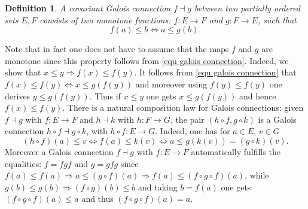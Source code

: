 \documentclass[12pt]{article}
\newtheorem{defn}[thm]{Definition}
\begin{document}
\begin{defn}\label{galois connection}
 A covariant Galois connection $f \dashv g$ between two  partially ordered sets $E,F$ consists of two monotone  functions: $f : E \to F$ and $g: F \to E$, such that 
\begin{equation}\label{equ galois connection}
f(a) \leq b \iff  a \leq  g(b).	
\end{equation}
\end{defn}
Note that in fact one does not have to assume that the maps $f$ and $g$ are monotone since this property follows from \eqref{equ galois connection}. Indeed, we show that $x\leq y\Rightarrow f(x)\leq f(y)$. It follows from \eqref{equ galois connection} that  $f(x)\leq f(y)\iff x\leq g(f(y))$ and moreover using $f(y)\leq f(y)$ one derives $y\leq  g(f(y))$. Thus if $x\leq y$ one gets $x\leq g(f(y))$ and hence $f(x)\leq f(y)$.\newline 
There is a natural composition law for Galois connections:  given $f\dashv g$ with $f : E \to F$ and $h\dashv k$ with  $h: F\to G$, the pair $(h\circ f, g\circ k)$ is a Galois connection $h\circ f\dashv  g\circ k$, with $h\circ f:E\to G$. Indeed, one has for $a\in E$, $v\in G$ 
  $$
  (h\circ f)(a)\leq v\iff f(a)\leq k(v)\iff a\leq g(k(v))=(g\circ k)(v).
  $$
  Moreover a Galois connection $f\dashv g$ with  $f:E\to F$ automatically fulfills the equalities: $f=fgf$ and $g=gfg$ since $f(a)\leq f(a)\Rightarrow a\leq (g\circ f)(a)\Rightarrow f(a)\leq (f\circ g\circ f)(a)$, while $g(b)\leq g(b)\Rightarrow (f\circ g)(b)\leq b$ and taking 
  $b=f(a)$ one gets  $(f\circ g\circ f)(a)\leq a$ and thus $(f\circ g\circ f)(a)= a$.
  
\end{document}
